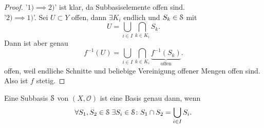 \begin{proof}
    '$1) \implies 2)$' ist klar, da Subbasiselemente offen sind. \\
    '$2) \implies 1)$'. Sei $U \subset Y$ offen, dann $\exists K_i$ endlich und $S_k \in \mathcal{S}$ mit
    \[
    U = \bigcup_{i \in  I} \bigcap_{k\in K_i} S_k
    .\] 
    Dann ist aber genau
    \[
        f^{-1}(U) = \bigcup_{i \in  I} \bigcap_{k\in K_i} \underbrace{f^{-1}(S_k)}_{\text{offen}} 
    .\] 
    offen, weil endliche Schnitte und beliebige Vereinigung offener Mengen offen sind. Also ist $f$ stetig.
\end{proof}

\begin{theorem}\label{thm:subbasis-ist-basis-wenn-schnitt-generiert-wird}
    Eine Subbasis $\mathcal{S}$ von  $(X, \mathcal{O})$ ist eine Basis genau dann, wenn
    \[
    \forall S_1, S_2 \in \mathcal{S} \;\exists S_i \in \mathcal{S} \colon S_1 \cap S_2 = \bigcup_{i \in I} S_i
    .\] 
\end{theorem}


